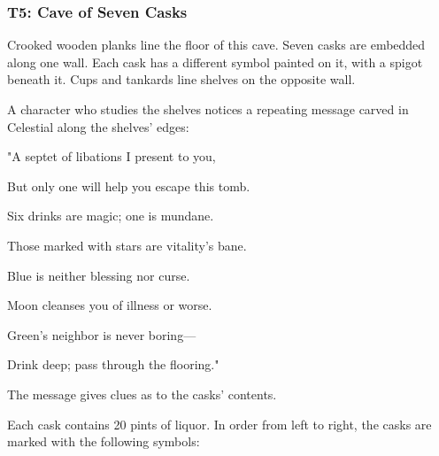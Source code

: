 \documentclass[10pt,a4paper,twoside,bg=print,twocolumn,openany,nodeprecatedcode]{dndbook}
\begin{document}
\subsubsection{T5: Cave of Seven Casks}
\begin{DndReadAloud}{}
Crooked wooden planks line the floor of this cave. Seven casks are embedded along one wall. Each cask has a different symbol painted on it, with a spigot beneath it. Cups and tankards line shelves on the opposite wall.

\end{DndReadAloud}

A character who studies the shelves notices a repeating message carved in Celestial along the shelves' edges:

\begin{DndReadAloud}{}
"A septet of libations I present to you,

But only one will help you escape this tomb.

Six drinks are magic; one is mundane.

Those marked with stars are vitality's bane.

Blue is neither blessing nor curse.

Moon cleanses you of illness or worse.

Green's neighbor is never boring—

Drink deep; pass through the flooring."

\end{DndReadAloud}

The message gives clues as to the casks' contents.

Each cask contains 20 pints of liquor. In order from left to right, the casks are marked with the following symbols:
\end{document}
